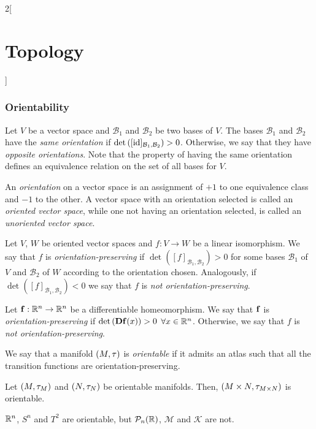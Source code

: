 \documentclass[../../../main.tex]{subfiles}
\begin{document}
\begin{multicols}{2}[\section{Topology}]
  \subsubsection{Orientability}
  \begin{definition}
    Let $V$ be a vector space and $\mathcal{B}_1$ and $\mathcal{B}_2$ be two bases of $V$. The bases $\mathcal{B}_1$ and $\mathcal{B}_2$ have the \emph{same orientation} if $\det\left([\mathrm{id}]_{\mathcal{B}_1,\mathcal{B}_2}\right)>0$. Otherwise, we say that they have \emph{opposite orientations}. Note that the property of having the same orientation defines an equivalence relation on the set of all bases for $V$.
  \end{definition}
  \begin{definition}
    An \emph{orientation} on a vector space is an assignment of $+1$ to one equivalence class and $-1$ to the other. A vector space with an orientation selected is called an \emph{oriented vector space}, while one not having an orientation selected, is called an \emph{unoriented vector space}.
  \end{definition}
  \begin{definition}
    Let $V$, $W$ be oriented vector spaces and $f:V\rightarrow W$ be a linear isomorphism. We say that $f$ is \emph{orientation-preserving} if $\det \left([f]_{\mathcal{B}_1,\mathcal{B}_2}\right)>0$ for some bases $\mathcal{B}_1$ of $V$ and $\mathcal{B}_2$ of $W$ according to the orientation chosen. Analogously, if $\det \left([f]_{\mathcal{B}_1,\mathcal{B}_2}\right)<0$ we say that $f$ is \emph{not orientation-preserving}.
  \end{definition}
  \begin{definition}
    Let $\boldsymbol{\mathrm{f}}:\mathbb{R}^n\rightarrow\mathbb{R}^n$ be a differentiable homeomorphism. We say that $\boldsymbol{\mathrm{f}}$ is \emph{orientation-preserving} if $\det \left(\boldsymbol{\mathrm{Df}}(x)\right)>0$ $\forall x\in\mathbb{R}^n$. Otherwise, we say that $f$ is \emph{not orientation-preserving}.
  \end{definition}
  \begin{definition}
    We say that a manifold $(M,\tau)$ is \emph{orientable} if it admits an atlas such that all the transition functions are orientation-preserving.
  \end{definition}
  \begin{prop}
    Let $(M,\tau_M)$ and $(N,\tau_N)$ be orientable manifolds. Then, $(M\times N,\tau_{M\times N})$ is orientable.
  \end{prop}
  \begin{prop}
    $\mathbb{R}^n$, $S^n$ and $T^2$ are orientable, but $\mathcal{P}_n(\mathbb{R})$, $\mathcal{M}$ and $\mathcal{K}$ are not.
  \end{prop}

\end{multicols}
\end{document}
